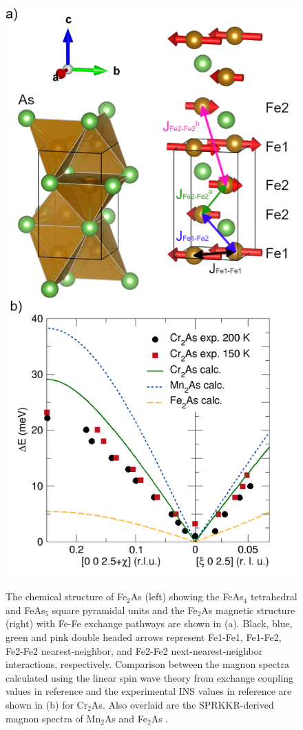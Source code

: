 \documentclass[letterpaper,10pt,doublespacing,edeposit]{uiucthesis2020}
\begin{document}
\begin{mainmatter}
\begin{figure}
\centering\includegraphics[width=0.65\columnwidth]{figures/ch8/Cr2As_INS_magnetic_structure.png} \\
\caption{\label{fig:Cr2As_plot}
The chemical structure of Fe$_2$As (left) showing the FeAs$_4$ tetrahedral and FeAs$_5$ square pyramidal units and the Fe$_2$As magnetic structure (right) with Fe-Fe exchange pathways are shown in (a). Black, blue, green and pink double headed arrows represent Fe1-Fe1, Fe1-Fe2, Fe2-Fe2 nearest-neighbor, and Fe2-Fe2 next-nearest-neighbor interactions, respectively. Comparison between the magnon spectra calculated using the linear spin wave theory from exchange coupling values in reference  and the experimental INS values in reference  are shown in (b) for Cr$_2$As. Also overlaid are the SPRKKR-derived magnon spectra of Mn$_2$As and Fe$_2$As \cite{Zhang2013}. 
} 
\end{figure}


\end{mainmatter}
\end{document}
